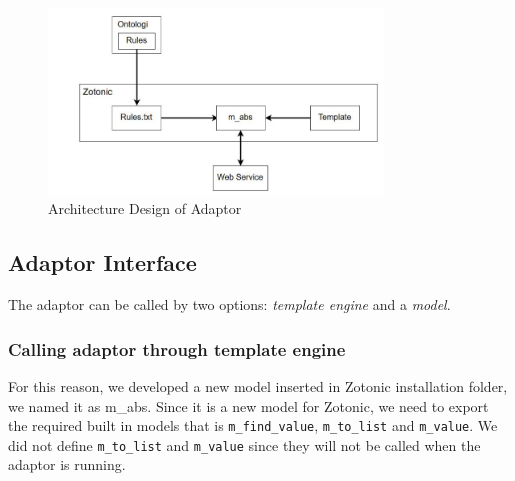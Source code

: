 \documentclass[conference]{IEEEtran}
\begin{document}
\begin{figure}[h]
\centering
\includegraphics[width=3.5in]{adaptordesign}

\caption{Architecture Design of Adaptor}
\label{fig_design}
\end{figure}

%

\subsection{Adaptor Interface}
The adaptor can be called by two options: \textit{template engine} and a \textit{model}. 

\subsubsection{Calling adaptor through template engine}
For this reason, we developed a new model inserted in Zotonic installation folder, we named it as m\_abs. Since it is a new model for Zotonic, we need to export the required built in models that is \texttt{m\_find\_value}, \texttt{m\_to\_list} and \texttt{m\_value}. We did not define \texttt{m\_to\_list} and \texttt{m\_value} since they will not be called when the adaptor is running.
\end{document}
